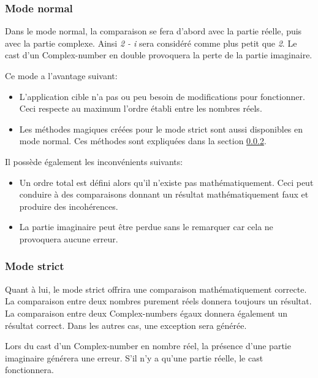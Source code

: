 \subsubsection{Mode normal}

Dans le mode normal, la comparaison se fera d'abord avec la partie réelle, puis avec la partie complexe. Ainsi \textit{2 - i} sera considéré comme plus petit que \textit{2}. Le cast d'un \gls{Complex-number} en double provoquera la perte de la partie imaginaire.

Ce mode a l'avantage suivant:

\begin{itemize}
    \item L'application cible n'a pas ou peu besoin de modifications pour fonctionner. Ceci respecte au maximum l'ordre établi entre les nombres réels.
    \item Les méthodes magiques créées pour le mode strict sont aussi disponibles en mode normal. Ces méthodes sont expliquées dans la section \ref{sec:complex_design_modes_strict}.
\end{itemize}

Il possède également les inconvénients suivants:

\begin{itemize}
    \item Un ordre total est défini alors qu'il n'existe pas mathématiquement. Ceci peut conduire à des comparaisons donnant un résultat mathématiquement faux et produire des incohérences.
    \item La partie imaginaire peut être perdue sans le remarquer car cela ne provoquera aucune erreur.
\end{itemize}

\subsubsection{Mode strict}
\label{sec:complex_design_modes_strict}

Quant à lui, le mode strict offrira une comparaison mathématiquement correcte. La comparaison entre deux nombres purement réels donnera toujours un résultat. La comparaison entre deux \glspl{Complex-number} égaux donnera également un résultat correct. Dans les autres cas, une exception sera générée.

Lors du cast d'un \gls{Complex-number} en nombre réel, la présence d'une partie imaginaire générera une erreur. S'il n'y a qu'une partie réelle, le cast fonctionnera.

